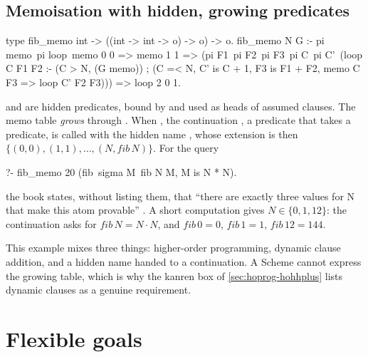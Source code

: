 \subsection{Memoisation with hidden, growing predicates}

\begin{example}\label{ex:hoprog-fib}\leavevmode
\begin{lprolog}
type fib_memo   int -> ((int -> int -> o) -> o) -> o.
fib_memo N G :-
   pi memo\ pi loop\
     memo 0 0 => memo 1 1 =>
     (pi F1\ pi F2\ pi F3\ pi C\ pi C'\
        (loop C F1 F2 :- (C >  N, (G memo)) ;
                         (C =< N, C' is C + 1, F3 is F1 + F2,
                          memo C F3 => loop C' F2 F3))) =>
     loop 2 0 1.
\end{lprolog}
 and  are hidden predicates, bound by  and used as heads of assumed clauses. The
memo table \emph{grows} through . When , the continuation , a
predicate that takes a predicate, is called with the hidden name \lp{memo}, whose extension is then
$\{(0,0),(1,1),\ldots,(N,\mathit{fib}\,N)\}$. For the query
\begin{lprolog}
?- fib_memo 20 (fib\ sigma M\ fib N M, M is N * N).
\end{lprolog}
the book states, without listing them, that ``there are exactly three values for N that make
this atom provable'' . A short computation gives $N\in\{0,1,12\}$: the continuation asks
for $\mathit{fib}\,N=N\cdot N$, and $\mathit{fib}\,0=0$, $\mathit{fib}\,1=1$, $\mathit{fib}\,12=144$.
\end{example}

This example mixes three things: higher-order programming, dynamic clause addition, and a hidden name
handed to a continuation. A Scheme  cannot express the growing table, which is why the
kanren box of \cref{sec:hoprog-hohhplus} lists dynamic clauses as a genuine requirement.

\section{Flexible goals}\label{sec:hoprog-flex}

